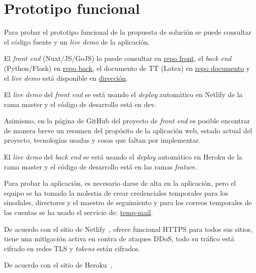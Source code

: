 \section{Prototipo funcional}

Para probar el prototipo funcional de la propuesta de solución se puede consultar el código fuente y un \textit{live demo} de la aplicación.


El \textit{front end} (Nuxt/JS/GoJS) lo puede consultar en \href{https://github.com/martinez-acosta/TT-2019-B052}{repo front}, el \textit{back end} (Python/Flask) en \href{https://github.com/omaraparicio07/api-tt-2019-b052}{repo back}, el documento de TT (Latex) en \href{https://github.com/martinez-acosta/DOCS-TT-2019-B052}{repo documento} y el \textit{live demo} está disponible en \href{https://serene-haibt-2239b4.netlify.app/}{dirección}.


El \textit{live demo} del \textit{front end} se está usando el \textit{deploy} automático en Netlify de la rama master y el código de desarrollo está en dev. 


Asimismo, en la página de GitHub del proyecto de \textit{front end} es posible encontrar de manera breve un resumen del propósito de la aplicación web, estado actual del proyecto, tecnologías usadas y cosas que faltan por implementar.


El \textit{live demo} del \textit{back end} se está usando el \textit{deploy} automático en Heroku de la rama master y el código de desarrollo está en las ramas \textit{feature}.


Para probar la aplicación, es necesario darse de alta en la aplicación, pero el equipo se ha tomado la molestia de crear credenciales temporales para los sinodales, directores y el maestro de seguimiento y para los correos temporales de las cuentas se ha usado el servicio de: \href{https://temp-mail.org/es/}{temp-mail}.


De acuerdo con el sitio de Netlify~\cite{netlify_netlify_nodate}, ofrece funcional HTTPS para todos sus sitios, tiene una mitigación activa en contra de ataques DDoS, todo su tráfico está cifrado en redes TLS y \textit{tokens} están cifrados.

De acuerdo con el sitio de Heroku~\cite{heroku_heroku_2020}, 